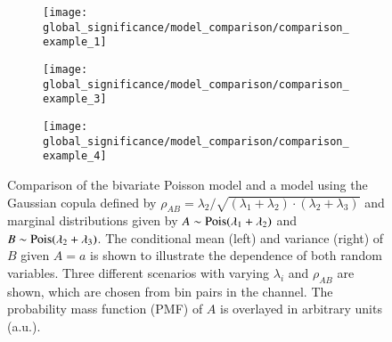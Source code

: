 \begin{figure}[htbp]
  \centering

  \begin{subfigure}{\textwidth}
    \centering
    \texttt{[image: global\_significance/model\_comparison/comparison\_example\_1]}
  \end{subfigure}

  \begin{subfigure}{\textwidth}
    \centering
    \texttt{[image: global\_significance/model\_comparison/comparison\_example\_3]}
  \end{subfigure}

  \begin{subfigure}{\textwidth}
    \centering
    \texttt{[image: global\_significance/model\_comparison/comparison\_example\_4]}
  \end{subfigure}

  \caption[Comparison of the bivariate Poisson model and a model consisting of
  two Poisson marginal distributions linked by a Gaussian copula.]{Comparison of
    the bivariate Poisson model and a model using the Gaussian copula defined by
    $\rho_{AB} = \lambda_2 / \sqrt{(\lambda_1 + \lambda_2) \cdot (\lambda_2 +
      \lambda_3)}$ and marginal distributions given by
    $A \sim \operatorname{Pois}(\lambda_1 + \lambda_2)$ and
    $B \sim \operatorname{Pois}(\lambda_2 + \lambda_3)$. The conditional mean (left) and
    variance (right) of $B$ given $A = a$ is shown to illustrate the dependence
    of both random variables. Three different scenarios with varying $\lambda_i$
    and $\rho_{AB}$ are shown, which are chosen from bin pairs in the \hadhad
    channel. The probability mass function (PMF) of $A$ is overlayed in
    arbitrary units (a.u.).}%
  \label{fig:copula_model_comparison}
\end{figure}

